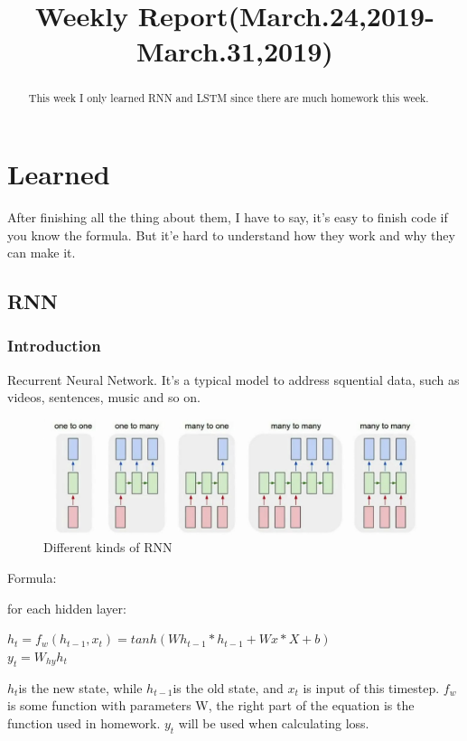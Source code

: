 \documentclass{article}
\title{Weekly Report(March.24,2019-March.31,2019)}
\begin{document}
\maketitle
\begin{abstract}
	This week I only learned RNN and LSTM since there are much homework this week.
\end{abstract}

\section{Learned}
After finishing all the thing about them, I have to say, it's easy to finish code if you know the formula. But it'e hard to understand how they work and why they can make it. 
\subsection{RNN}
\subsubsection{Introduction}
Recurrent Neural Network. It's a typical model to address squential data, such as videos, sentences, music and so on.\\
\begin{figure}[h]
	\centering  %
	\includegraphics[width=1\textwidth]{1.png} 
	\caption{Different kinds of RNN}  %
	\label{fig:f1}   %
\end{figure}

Formula:

for each hidden layer:
\begin{center}
${\displaystyle h_t=f_w(h_{t-1}, x_t)=tanh(Wh_{t-1}*h_{t-1}+Wx*X+b)}$\\
${y_t=W_{hy}h_t}$
\end{center}
${h_t}$is the new state, while ${h_{t-1}}$is the old state, and ${x_t}$ is input of this timestep. ${f_w}$ is some function with parameters W, the right part of the equation is the function used in homework. ${y_t}$ will be used when calculating loss.
\end{document}
